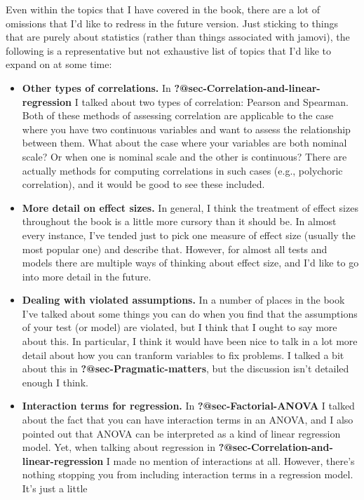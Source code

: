 \documentclass[
  a4paper,
]{book}
\begin{document}
Even within the topics that I have covered in the book, there are a lot
of omissions that I'd like to redress in the future version. Just
sticking to things that are purely about statistics (rather than things
associated with jamovi), the following is a representative but not
exhaustive list of topics that I'd like to expand on at some time:

\begin{itemize}
\item
  \textbf{Other types of correlations.} In
  \textbf{?@sec-Correlation-and-linear-regression} I talked about two
  types of correlation: Pearson and Spearman. Both of these methods of
  assessing correlation are applicable to the case where you have two
  continuous variables and want to assess the relationship between them.
  What about the case where your variables are both nominal scale? Or
  when one is nominal scale and the other is continuous? There are
  actually methods for computing correlations in such cases (e.g.,
  polychoric correlation), and it would be good to see these included.
\item
  \textbf{More detail on effect sizes.} In general, I think the
  treatment of effect sizes throughout the book is a little more cursory
  than it should be. In almost every instance, I've tended just to pick
  one measure of effect size (usually the most popular one) and describe
  that. However, for almost all tests and models there are multiple ways
  of thinking about effect size, and I'd like to go into more detail in
  the future.
\item
  \textbf{Dealing with violated assumptions.} In a number of places in
  the book I've talked about some things you can do when you find that
  the assumptions of your test (or model) are violated, but I think that
  I ought to say more about this. In particular, I think it would have
  been nice to talk in a lot more detail about how you can tranform
  variables to fix problems. I talked a bit about this in
  \textbf{?@sec-Pragmatic-matters}, but the discussion isn't detailed
  enough I think.
\item
  \textbf{Interaction terms for regression.} In
  \textbf{?@sec-Factorial-ANOVA} I talked about the fact that you can
  have interaction terms in an ANOVA, and I also pointed out that ANOVA
  can be interpreted as a kind of linear regression model. Yet, when
  talking about regression in
  \textbf{?@sec-Correlation-and-linear-regression} I made no mention of
  interactions at all. However, there's nothing stopping you from
  including interaction terms in a regression model. It's just a little

\end{itemize}
\end{document}
